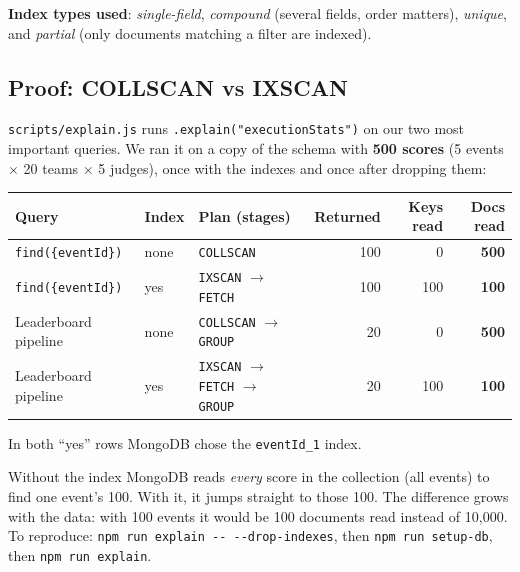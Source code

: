 \documentclass[11pt,a4paper]{article}
\begin{document}
\textbf{Index types used}: \emph{single-field}, \emph{compound} (several fields, order matters),
\emph{unique}, and \emph{partial} (only documents matching a filter are indexed).

\subsection{Proof: COLLSCAN vs IXSCAN}
\texttt{scripts/explain.js} runs \texttt{.explain("executionStats")} on our two most important queries. We ran it on a
copy of the schema with \textbf{500 scores} (5 events $\times$ 20 teams $\times$ 5 judges), once with the indexes and
once after dropping them:

\begin{center}
{\small\setlength{\tabcolsep}{5pt}
\begin{tabular}{@{}lllrrr@{}}
\toprule
\textbf{Query} & \textbf{Index} & \textbf{Plan (stages)} & \textbf{Returned} & \textbf{Keys read} & \textbf{Docs read}\\
\midrule
\texttt{find(\{eventId\})} & none & \texttt{COLLSCAN} & 100 & 0 & \textbf{500}\\
\texttt{find(\{eventId\})} & yes & \texttt{IXSCAN} $\rightarrow$ \texttt{FETCH} & 100 & 100 & \textbf{100}\\
Leaderboard pipeline & none & \texttt{COLLSCAN} $\rightarrow$ \texttt{GROUP} & 20 & 0 & \textbf{500}\\
Leaderboard pipeline & yes & \texttt{IXSCAN} $\rightarrow$ \texttt{FETCH} $\rightarrow$ \texttt{GROUP} & 20 & 100 & \textbf{100}\\
\bottomrule
\end{tabular}}
\end{center}
In both ``yes'' rows MongoDB chose the \texttt{eventId\_1} index.

Without the index MongoDB reads \emph{every} score in the collection (all events) to find one event's 100. With it,
it jumps straight to those 100. The difference grows with the data: with 100 events it would be 100 documents read
instead of 10{,}000. To reproduce: \mbox{\texttt{npm run explain -{}- -{}-drop-indexes}}, then
\texttt{npm run setup-db}, then \texttt{npm run explain}.

\end{document}
